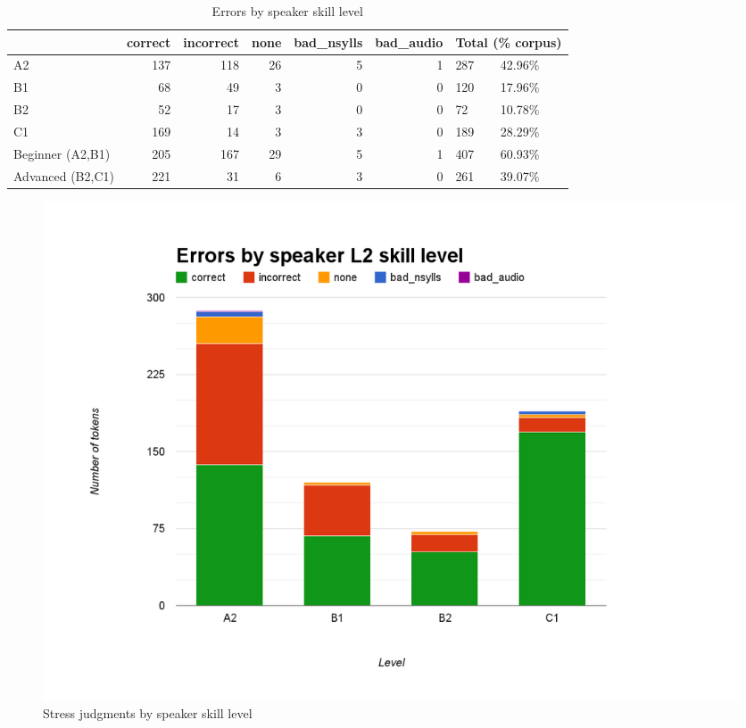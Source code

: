 		\begin{table}
			\caption{Errors by speaker skill level}
				\begin{tabularx}{\textwidth}{XrrrrrXX}		
				\toprule
				 & correct	& incorrect &	none &		bad\_nsylls & 		{bad\_audio} & \multicolumn{2}{c}{Total (\% corpus)} \\
				\midrule			
A2	&	137	&			118	&			26	&			5	&			1	&			287	&	42.96\%	\\
B1	&	68	&			49	&			3	&			0	&			0	&			120	&	17.96\%	\\
B2	&	52	&			17	&			3	&			0	&			0	&			72	&	10.78\%	\\
C1	&	169	&			14	&			3	&			3	&			0	&			189	&	28.29\%	\\
				\midrule					
Beginner (A2,B1)	&	205	&			167	&			29	&			5	&			1	&			407	&	60.93\%	\\
Advanced (B2,C1)	&	221	&			31	&			6	&			3	&			0	&			261	&	39.07\%	\\
				\bottomrule
				\end{tabularx}
				\label{tab:results:levels}
			\end{table}						
			
			
			
			\begin{figure}[ht]
				\centering
				\includegraphics[width=\textwidth]{img/annotation/skillLevelBars}
				\caption{Stress judgments by speaker skill level }
				\label{fig:levelbars}
			\end{figure}
		
